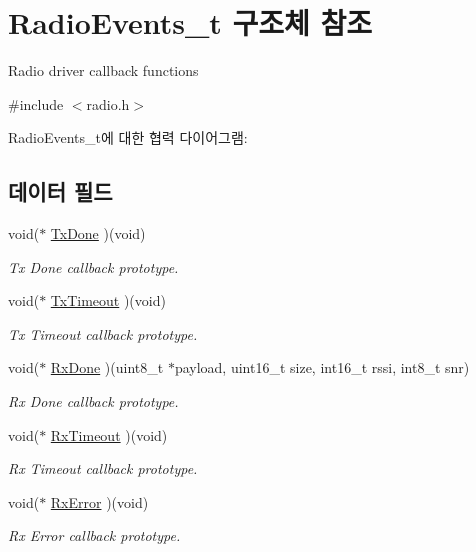 \hypertarget{struct_radio_events__t}{}\section{Radio\+Events\+\_\+t 구조체 참조}
\label{struct_radio_events__t}


Radio driver callback functions  




{\ttfamily \#include $<$radio.\+h$>$}



Radio\+Events\+\_\+t에 대한 협력 다이어그램\+:
\subsection*{데이터 필드}
\begin{DoxyCompactItemize}
\item 
void($\ast$ \mbox{\hyperlink{struct_radio_events__t_af3d5845be2b1d9298fec8aea76ac07aa}{Tx\+Done}} )(void)
\begin{DoxyCompactList}\small\item\em Tx Done callback prototype. \end{DoxyCompactList}\item 
void($\ast$ \mbox{\hyperlink{struct_radio_events__t_a869fb2c61e5aee8f8b104345d510e7f3}{Tx\+Timeout}} )(void)
\begin{DoxyCompactList}\small\item\em Tx Timeout callback prototype. \end{DoxyCompactList}\item 
void($\ast$ \mbox{\hyperlink{struct_radio_events__t_a7b337c532d25153f0197537cb81eed49}{Rx\+Done}} )(uint8\+\_\+t $\ast$payload, uint16\+\_\+t size, int16\+\_\+t rssi, int8\+\_\+t snr)
\begin{DoxyCompactList}\small\item\em Rx Done callback prototype. \end{DoxyCompactList}\item 
void($\ast$ \mbox{\hyperlink{struct_radio_events__t_a0baf0babc5416ab7f30e59e5afd3af7f}{Rx\+Timeout}} )(void)
\begin{DoxyCompactList}\small\item\em Rx Timeout callback prototype. \end{DoxyCompactList}\item 
void($\ast$ \mbox{\hyperlink{struct_radio_events__t_aa218d9f2e2bd1a4188b50b2cee24e8ad}{Rx\+Error}} )(void)
\begin{DoxyCompactList}\small\item\em Rx Error callback prototype. \end{DoxyCompactList}\item 

\end{DoxyCompactItemize}

